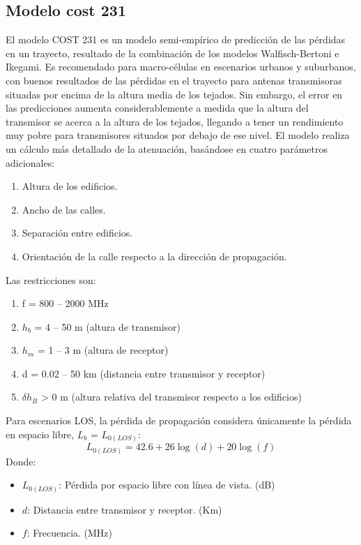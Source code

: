 \documentclass[
	12pt, %
	fleqn, %
	a4paper, %
	oneside, %
]{LegrandOrangeBook}
\begin{document}
\subsection{Modelo cost 231}
El modelo COST 231 es un modelo semi-empírico de predicción de las pérdidas en un trayecto, resultado de la combinación de los modelos Walfisch-Bertoni e Ikegami. Es recomendado para macro-células en escenarios urbanos y suburbanos, con buenos resultados de las pérdidas en el trayecto para antenas transmisoras situadas por encima de la altura media de los tejados. Sin embargo, el error en las predicciones aumenta considerablemente a medida que la altura del transmisor se acerca a la altura de los tejados, llegando a tener un rendimiento muy pobre para transmisores situados por debajo de ese nivel. El modelo realiza un cálculo más detallado de la atenuación, basándose en cuatro parámetros adicionales:
\begin{enumerate}
\item Altura de los edificios.
\item Ancho de las calles.
\item Separación entre edificios.
\item Orientación de la calle respecto a la dirección de propagación.
\end{enumerate}
Las restricciones son:
\begin{enumerate}
\item f = 800 – 2000 MHz
\item $h_b$ = 4 – 50 m (altura de transmisor)
\item $h_m$ = 1 – 3 m (altura de receptor)
\item d = 0.02 – 50 km (distancia entre transmisor y receptor)
\item $\delta h_B$ > 0 m (altura relativa del transmisor respecto a los edificios)
\end{enumerate}
Para escenarios LOS, la pérdida de propagación considera únicamente la pérdida en espacio libre, $L_b$ = $L_{0(LOS)}$:
\begin{equation}
L_{0(LOS)}=42.6+26\log(d)+20\log(f)
\end{equation}
Donde:
\begin{itemize}
\item $L_{0(LOS)}$: Pérdida por espacio libre con línea de vista. (dB)
\item $d$: Distancia entre transmisor y receptor. (Km)
\item $f$: Frecuencia. (MHz)
\end{itemize}
\begin{figure}[H]
\centering
{}\\
\end{figure}
\end{document}
